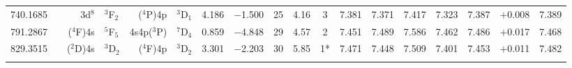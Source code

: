 \documentclass[traditabstract]{aa}
\newcommand{\pst}{\phantom{*}}
\begin{document}
\begin{center}
\begin{mpsupertabular}{r@{}c@{\ \ \ }r@{~}l@{\ }r@{~}l@{\ \ \ }c@{\ \ \ }c@{\ \ \ }c@{\ \ \ }c@{\ \ \ }c@{\ \ \ }c@{\ \ \ }c@{\ \ \ }c@{\ \ \ }c@{\ \ \ }c@{\ \ \ }r@{\ \ \ }c}
740.1685 & & \footnotesize3d$^8$     &\footnotesize$^3$F$_2$             &\footnotesize($^4$P)4p  &\footnotesize$^3$D$_1$             & 4.186 & $-$1.500 & 25 & 4.16 & 3\pst      & 7.381 & 7.371 & 7.417 & 7.323 & 7.387 & $+$0.008    & 7.389 \\ 
791.2867 & & \footnotesize($^4$F)4s  &\footnotesize$^5$F$_5$             &\footnotesize4s4p($^3$P)&\footnotesize$^7$D$_4$             & 0.859 & $-$4.848 & 29 & 4.57 & 2\pst      & 7.451 & 7.489 & 7.586 & 7.462 & 7.486 & $+$0.017    & 7.468 \\ 
829.3515 & & \footnotesize($^2$D)4s  &\footnotesize$^3$D$_2$             &\footnotesize($^4$F)4p  &\footnotesize$^3$D$_2$             & 3.301 & $-$2.203 & 30 & 5.85 & 1*         & 7.471 & 7.448 & 7.509 & 7.401 & 7.453 & $+$0.011    & 7.482 \\ 
   & & & & & & & & & & & & & & & \\		


\end{mpsupertabular}
\end{center}
\end{document}

